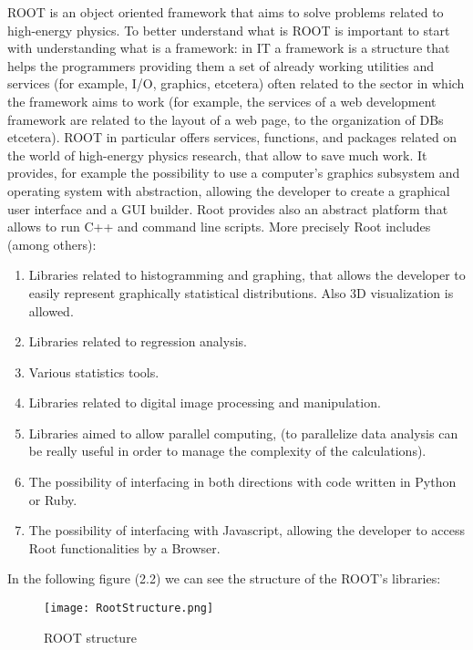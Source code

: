 ROOT is an object oriented framework that aims to solve problems related to high-energy physics. To better understand what is ROOT is important to start with understanding what is a framework: in IT a framework is a structure that helps the programmers providing them a set of already working utilities and services (for example, I/O, graphics, etcetera) often related to the sector in which the framework aims to work (for example, the services of a web development framework are related to the layout of a web page, to the organization of DBs etcetera). ROOT in particular offers services, functions, and packages related on the world of high-energy physics research, that allow to save much work.
It provides, for example the possibility to use a computer's graphics subsystem and operating system with abstraction, allowing the developer to create a graphical user interface and a GUI builder. Root provides also an abstract platform that allows to run C++ and command line scripts. More precisely Root includes (among others):

\begin{enumerate}

\item Libraries related to histogramming and graphing, that allows the developer to easily represent graphically statistical distributions. Also 3D visualization is allowed.

\item Libraries related to regression analysis.

\item Various statistics tools. 

\item Libraries related to digital image processing and manipulation.

\item Libraries aimed to allow parallel computing, (to parallelize data analysis can be really useful in order to manage the complexity of the calculations).

\item The possibility of interfacing in both directions with code written in Python or Ruby.

\item The possibility of interfacing with Javascript, allowing the developer to access Root functionalities by a Browser.

\end{enumerate}

In the following figure (2.2) we can see the structure of the ROOT's libraries:

\begin{figure}[H]
\centering
\texttt{[image: RootStructure.png]} 
\caption{ROOT structure}
\end{figure}


